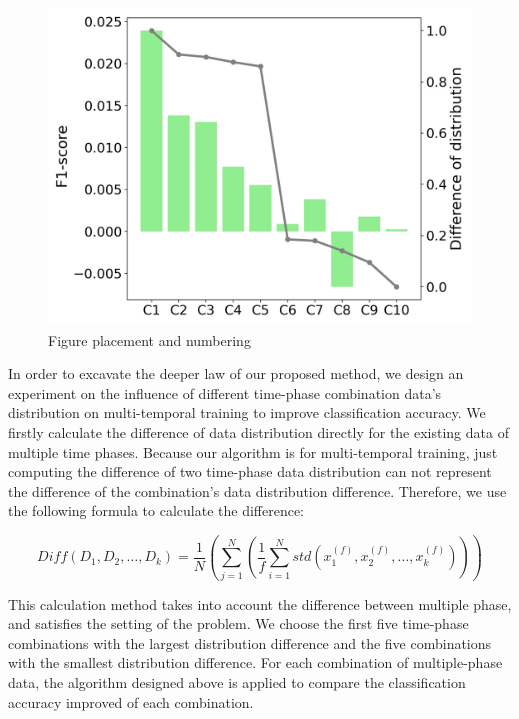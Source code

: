 \documentclass{isprs} %
\begin{document}
\begin{figure}[ht!]
	\begin{center}
			\includegraphics[width=1.0\columnwidth]{figures/images/yearsdiff_compare_multiself_vegimprove_label3unlabel5.jpg}
		\caption{Figure placement and numbering}
	\label{fig:studyArea}
	\end{center}
\end{figure}
In order to excavate the deeper law of our proposed method, we design an experiment on the influence of different time-phase combination data’s distribution on multi-temporal training to improve classification accuracy. We firstly calculate the difference of data distribution directly for the existing data of multiple time phases. Because our algorithm is for multi-temporal training, just computing the difference of two time-phase data distribution can not represent the difference of the combination’s data distribution difference. Therefore, we use the following formula to calculate the difference:

\begin{equation}
	Diff(D_1,D_2,\dots,D_k)=\frac{1}{N}(\sum\limits_{j=1}^{N}(\frac{1}{f}\sum\limits_{i=1}^{N}std(x_{1}^{(f)},x_{2}^{(f)},\dots,x_{k}^{(f)})))
\end{equation}

This calculation method takes into account the difference between multiple phase, and satisfies the setting of the problem. We choose the first five time-phase combinations with the largest distribution difference and the five combinations with the smallest distribution difference. For each combination of multiple-phase data, the algorithm designed above is applied to compare the classification accuracy improved of each combination.
\end{document}
